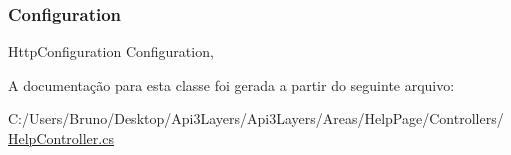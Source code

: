 \subsubsection{\texorpdfstring{Configuration}{Configuration}}
{\footnotesize\ttfamily Http\+Configuration Configuration\hspace{0.3cm}{\ttfamily [get]}, {}}



A documentação para esta classe foi gerada a partir do seguinte arquivo\+:\begin{DoxyCompactItemize}
\item 
C\+:/\+Users/\+Bruno/\+Desktop/\+Api3\+Layers/\+Api3\+Layers/\+Areas/\+Help\+Page/\+Controllers/\hyperlink{HelpController_8cs}{Help\+Controller.\+cs}\end{DoxyCompactItemize}
